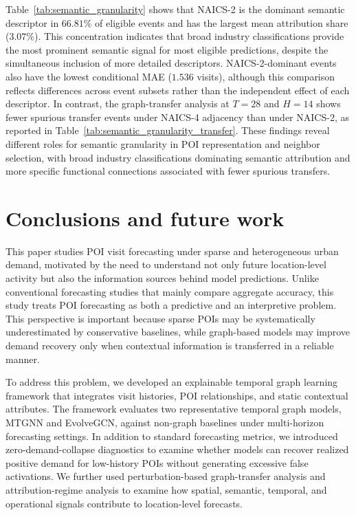 \documentclass[preprint,authoryear,11pt]{elsarticle}
\theoremstyle{definition}
\begin{document}
Table~\ref{tab:semantic_granularity} shows that NAICS-2 is the dominant semantic descriptor in \(66.81\%\) of eligible events and has the largest mean attribution share (\(3.07\%\)).
This concentration indicates that broad industry classifications provide the most prominent semantic signal for most eligible predictions, despite the simultaneous inclusion of more detailed descriptors.
NAICS-2-dominant events also have the lowest conditional MAE (\(1.536\) visits), although this comparison reflects differences across event subsets rather than the independent effect of each descriptor.
In contrast, the graph-transfer analysis at \(T=28\) and \(H=14\) shows fewer spurious transfer events under NAICS-4 adjacency than under NAICS-2, as reported in Table~\ref{tab:semantic_granularity_transfer}.
These findings reveal different roles for semantic granularity in POI representation and neighbor selection, with broad industry classifications dominating semantic attribution and more specific functional connections associated with fewer spurious transfers.


\section{Conclusions and future work}
\label{conclude}

This paper studies POI visit forecasting under sparse and heterogeneous urban demand, motivated by the need to understand not only future location-level activity but also the information sources behind model predictions. Unlike conventional forecasting studies that mainly compare aggregate accuracy, this study treats POI forecasting as both a predictive and an interpretive problem. 
This perspective is important because sparse POIs may be systematically underestimated by conservative baselines, while graph-based models may improve demand recovery only when contextual information is transferred in a reliable manner.

To address this problem, we developed an explainable temporal graph learning framework that integrates visit histories, POI relationships, and static contextual attributes. The framework evaluates two representative temporal graph models, MTGNN and EvolveGCN, against non-graph baselines under multi-horizon forecasting settings. In addition to standard forecasting metrics, we introduced zero-demand-collapse diagnostics to examine whether models can recover realized positive demand for low-history POIs without generating excessive false activations. We further used perturbation-based graph-transfer analysis and attribution-regime analysis to examine how spatial, semantic, temporal, and operational signals contribute to location-level forecasts.
\end{document}
